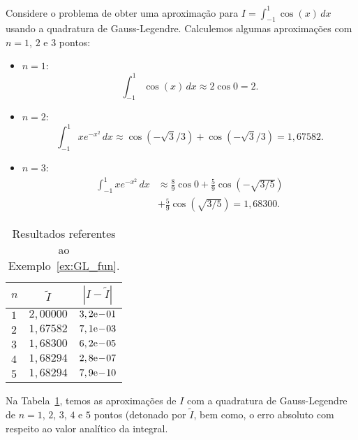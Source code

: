 \begin{ex}\label{ex:GL_fun}
  Considere o problema de obter uma aproximação para $I = \int_{-1}^1 \cos(x)\,dx$ usando a quadratura de Gauss-Legendre. Calculemos algumas aproximações com $n=1$, $2$ e $3$ pontos:
  \begin{itemize}
  \item $n=1$:
    \begin{equation}
      \int_{-1}^1 \cos(x)\,dx \approx 2 \cos 0 = 2.
    \end{equation}
  \item $n=2$:
    \begin{equation}
      \int_{-1}^1 xe^{-x^2}\,dx \approx \cos(-\sqrt{3}/3) + \cos(-\sqrt{3}/3) = 1,67582.
    \end{equation}
  \item $n=3$:
    \begin{align}
      \int_{-1}^1 xe^{-x^2}\,dx &\approx \frac{8}{9}\cos 0 + \frac{5}{9}\cos(-\sqrt{3/5}) \nonumber\\
      &+ \frac{5}{9}\cos(\sqrt{3/5}) = 1,68300.
    \end{align}
  \end{itemize}

\begin{table}[h!]
  \centering
  \begin{tabular}{lcc}
    $n$ & $\tilde{I}$ & $|I-\tilde{I}|$ \\\hline
    $1$ & $2,00000$ & $3,2\mathrm{e}\!-\!01$ \\
    $2$ & $1,67582$ & $7,1\mathrm{e}\!-\!03$ \\
    $3$ & $1,68300$ & $6,2\mathrm{e}\!-\!05$ \\
    $4$ & $1,68294$ & $2,8\mathrm{e}\!-\!07$ \\
    $5$ & $1,68294$ & $7,9\mathrm{e}\!-\!10$ \\\hline
  \end{tabular}
  \caption{Resultados referentes ao Exemplo~\ref{ex:GL_fun}.}
  \label{tab:ex_GL_fun}
\end{table}

Na Tabela~\ref{tab:ex_GL_fun}, temos as aproximações de $I$ com a quadratura de Gauss-Legendre de $n=1$, $2$, $3$, $4$ e $5$ pontos (detonado por $\tilde{I}$, bem como, o erro absoluto com respeito ao valor analítico da integral.



\end{ex}
